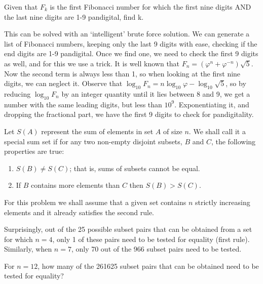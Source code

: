 Given that $F_{k}$ is the first Fibonacci number for which the first nine digits AND the last nine digits are 1-9 pandigital, find k.

This can be solved with an `intelligent' brute force solution.  We can generate a list of Fibonacci numbers, keeping only the last 9 digits with ease, checking if the end digits are 1-9 pandigital.  Once we find one, we need to check the first 9 digits as well, and for this we use a trick.  It is well known that $F_n = (\varphi^n + \varphi^{-n})\sqrt{5}$.  Now the second term is always less than 1, so when looking at the first nine digits, we can neglect it.  Observe that $\log_{10}F_n = n\log_{10} \varphi - \log_{10}\sqrt{5}$, so by reducing $\log_{10} F_n$ by an integer quantity until it lies between 8 and 9, we get a number with the same leading digits, but less than $10^9$.  Exponentiating it, and dropping the fractional part, we have the first 9 digits to check for pandigitality.






\ans{---}




Let $S(A)$ represent the sum of elements in set $A$ of size $n$. We shall call it a special sum set if for any two non-empty disjoint subsets, $B$ and $C$, the following properties are true:
\begin{enumerate}
\item $S(B) \neq S(C)$; that is, sums of subsets cannot be equal.
\item If $B$ contains more elements than $C$ then $S(B) > S(C)$.
\end{enumerate}
For this problem we shall assume that a given set contains $n$ strictly increasing elements and it already satisfies the second rule.

Surprisingly, out of the 25 possible subset pairs that can be obtained from a set for which $n = 4$, only 1 of these pairs need to be tested for equality (first rule). Similarly, when $n = 7$, only 70 out of the 966 subset pairs need to be tested.

For $n = 12$, how many of the 261625 subset pairs that can be obtained need to be tested for equality?


